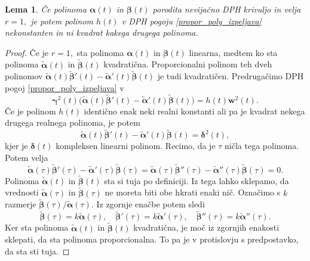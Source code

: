 \documentclass[12pt,a4paper,twoside]{article}
\theoremstyle{definition} %
\theoremstyle{plain} %
\newtheorem{lema}[definicija]{Lema}
\numberwithin{equation}{section}  %
\newcommand{\wV}{\mathbf{w}}
\newcommand{\balpha}{\boldsymbol \alpha}
\newcommand{\bbeta}{\boldsymbol \beta}
\newcommand{\bgamma}{\boldsymbol \gamma}
\newcommand{\bdelta}{\boldsymbol \delta}
\newcommand{\btalpha}{\tilde{\boldsymbol \alpha}}
\newcommand{\btbeta}{\tilde{\boldsymbol \beta}}
\begin{document}
\begin{lema}
	\label{lema_2}
	Če polinoma $\balpha(t)$ in $\bbeta(t)$ porodita nevijačno DPH krivuljo in velja $r=1,$ je potem polinom $h(t)$ v DPH pogoju \eqref{propor_poly_izpeljava} nekonstanten in ni kvadrat kakega drugega polinoma.
\end{lema}
\begin{proof}
	Če je $r=1,$ sta polinoma $\balpha(t)$ in $\bbeta(t)$ linearna, medtem ko sta polinoma $\btalpha(t)$ in $\btbeta(t)$ kvadratična. Proporcionalni polinom teh dveh polinomov $\btalpha(t)\btbeta'(t)-\btalpha'(t)\btbeta(t)$ je tudi kvadratičen. Predrugačimo DPH pogoj \eqref{propor_poly_izpeljava} v
	\begin{equation}
		\label{propor_poly_tilde}
		\bgamma^2(t)\big(\btalpha(t)\btbeta'(t)-\btalpha'(t)\btbeta(t)\big)=h(t)\wV^2(t).
	\end{equation}
	Če je polinom $h(t)$ identično enak neki realni konstanti ali pa je kvadrat nekega drugega realnega polinoma, je potem
	\begin{equation}
		\label{propor_poly_tilde2}
		\btalpha(t)\btbeta'(t)-\btalpha'(t)\btbeta(t)=\bdelta^2(t),
	\end{equation}
	kjer je $\bdelta(t)$ kompleksen linearni polinom. Recimo, da je $\tau$ ničla tega polinoma. Potem velja
	\begin{equation}
		\label{propor_poly_tilde3}
		\btalpha(\tau)\btbeta'(\tau)-\btalpha'(\tau)\btbeta(\tau)=\btalpha(\tau)\btbeta''(\tau)-\btalpha''(\tau)\btbeta(\tau)=0.
	\end{equation}
	Polinoma $\btalpha(t)$ in $\btbeta(t)$ sta si tuja po definiciji. Iz tega lahko sklepamo, da vrednosti $\btalpha(\tau)$ in $\btbeta(\tau)$ ne moreta biti obe hkrati enaki nič. Označimo s $k$ razmerje $\btbeta(\tau)/\btalpha(\tau).$ Iz zgornje enačbe potem sledi
	\begin{equation}
		\btbeta(\tau)=k\btalpha(\tau),\quad\btbeta'(\tau)=k\btalpha'(\tau),\quad\btbeta''(\tau)=k\btalpha''(\tau).
	\end{equation}
	Ker sta polinoma $\btalpha(t)$ in $\btbeta(t)$ kvadratična, je moč iz zgornjih enakosti sklepati, da sta polinoma proporcionalna. To pa je v protislovju s predpostavko, da sta sti tuja.
	

\end{proof}
\end{document}
